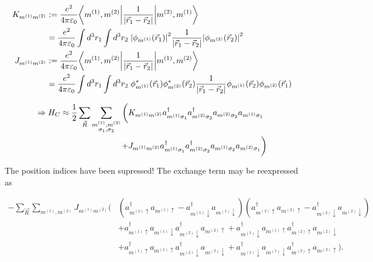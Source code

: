 \documentclass[../../main.tex]{subfiles}
\begin{document}
\begin{align}
	K_{m^{(1)} m^{(2)}} &:= \frac{e^2}{4\pi \varepsilon_0} \bigg\langle m^{(1)}, m^{(2)} \bigg| \frac{1}{\abs{\vec{r}_1-\vec{r}_2}} \bigg| m^{(2)}, m^{(1)} \bigg\rangle \notag \\
	&= \frac{e^2}{4\pi\varepsilon_0} \int d^3 r_1 \int d^3 r_2 \; \abs{\phi_{m^{(1)}}(\vec{r}_1)}^2 \frac{1}{\abs{\vec{r}_1-\vec{r}_2}} \abs{\phi_{m^{(2)}}(\vec{r}_2)}^2 \\
	J_{m^{(1)} m^{(2)}} &:= \frac{e^2}{4\pi \varepsilon_0} \bigg\langle m^{(1)}, m^{(2)} \bigg| \frac{1}{\abs{\vec{r}_1-\vec{r}_2}} \bigg| m^{(1)}, m^{(2)} \bigg\rangle \notag \\
	&= \frac{e^2}{4\pi\varepsilon_0} \int d^3 r_1 \int d^3 r_2 \; \phi_{m^{(1)}}^*(\vec{r}_1) \phi_{m^{(2)}}^*(\vec{r}_2)  \frac{1}{\abs{\vec{r}_1-\vec{r}_2}} \phi_{m^{(1)}}(\vec{r}_2) \phi_{m^{(2)}}(\vec{r}_1)
\end{align}

\begin{align}
	\Rightarrow H_{C} \approx \frac12 \sum_{\vec{R}} \sum_{\substack{m^{(1)}, m^{(2)} \\\sigma_1, \sigma_2}} \bigg( &K_{m^{(1)} m^{(2)}} a_{m^{(1)} \sigma_1}^\dagger a_{ m^{(2)} \sigma_2}^\dagger a_{ m^{(2)} \sigma_2} a_{ m^{(1)} \sigma_1} \notag \\  + &J_{m^{(1)} m^{(2)}} a_{ m^{(1)} \sigma_1}^\dagger a_{m^{(2)} \sigma_2}^\dagger a_{m^{(1)} \sigma_2} a_{m^{(2)} \sigma_1} \bigg)
\end{align}

The position indices have been supressed! The exchange term may be reexpressed as 

\begin{equation}
\begin{split}
	-\sum_{\vec{R}}\sum_{m^{(1)}, m^{(2)}} J_{m^{(1)} m^{(2)}}\bigg( &\left(a_{m^{(1)} \uparrow}^\dagger a_{m^{(1)} \uparrow} - a_{m^{(1)} \downarrow}^\dagger a_{m^{(1)}\downarrow} \right)\left(a_{m^{(2)} \uparrow}^\dagger a_{m^{(2)} \uparrow} - a_{m^{(2)} \downarrow}^\dagger a_{m^{(2)}\downarrow}\right) \\
	&+ a_{m^{(1)}\uparrow}^\dagger a_{m^{(1)}\downarrow} a_{m^{(2)}\downarrow}^\dagger a_{m^{(2)}\uparrow} + a_{m^{(1)}\downarrow}^\dagger a_{m^{(1)}\uparrow} a_{m^{(2)}\uparrow}^\dagger a_{m^{(2)}\downarrow} \\
	& + a_{m^{(1)}\uparrow}^\dagger a_{m^{(1)} \uparrow} a_{m^{(2)} \downarrow}^\dagger a_{m^{(2)} \downarrow} + a_{m^{(1)}\downarrow}^\dagger a_{m^{(1)} \downarrow} a_{m^{(2)} \uparrow}^\dagger a_{m^{(2)} \uparrow} \bigg). 
\end{split}
\end{equation}
\end{document}
